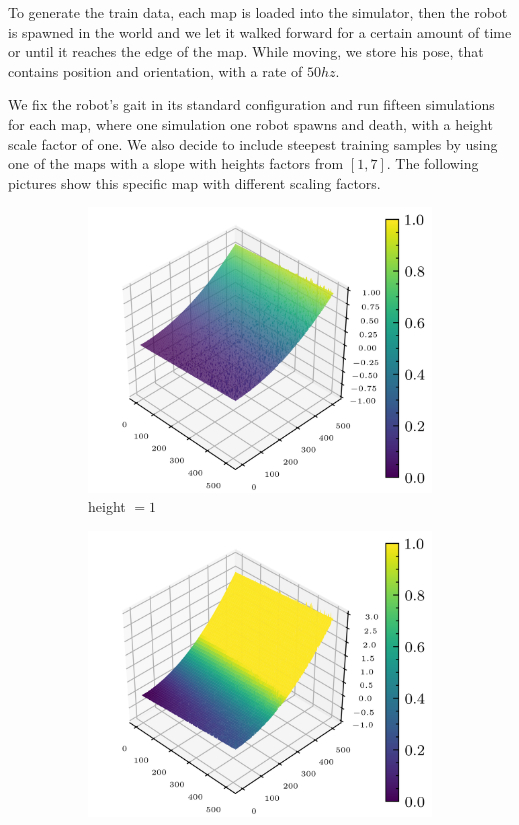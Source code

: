 \documentclass[../document.tex]{subfiles}
\begin{document}
To generate the train data, each map is loaded into the simulator, then the robot is spawned in the world and we let it walked forward for a certain amount of time or until it reaches the edge of the map. While moving, we store his pose, that contains position and orientation, with a rate of $50hz$. 

We fix the robot's gait in its standard configuration and run fifteen simulations for each map, where one simulation one robot spawns and death, with a height scale factor of one. We also decide to include steepest training samples by using one of the maps with a slope with heights factors from $[1,7]$. The following pictures show this specific map with different scaling factors. 

\begin{figure} [htbp]
    	\begin{subfigure}[b]{0.5\textwidth}
			\includegraphics[width=\textwidth]{../img/hm3d/slope_rocks2.png}
			\caption{height $=1$}
	    \end{subfigure}
		\begin{subfigure}[b]{0.5\textwidth}
			\includegraphics[width=\textwidth]{../img/hm3d/3-slope_rocks2.png}

\end{subfigure}
\end{figure}
\end{document}
